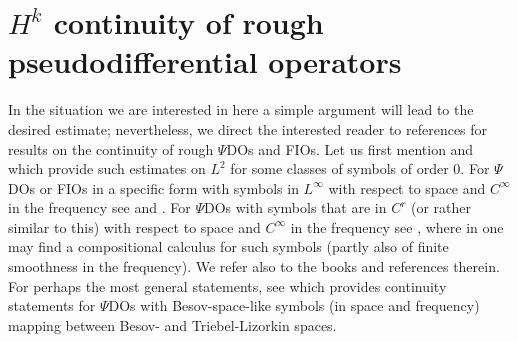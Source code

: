 \documentclass[11pt]{amsart}
\theoremstyle{definition}
\numberwithin{equation}{section}
\begin{document}
    


    



    























\section{$H^k$ continuity of rough pseudodifferential operators} \label{sec_continuity_psdo}

In the situation we are interested in here a simple argument will lead to the desired estimate; nevertheless, we direct the interested reader to references for results on the continuity of rough $\Psi$DOs and FIOs. Let us first mention \cite[Chp.~XI~Thm.~2.2]{zbMATH03709065} and \cite[Thm.~18.1.11']{zbMATH05129478} which provide such estimates on $L^2$ for some classes of symbols of order $0$. For $\Psi$DOs or FIOs in a specific form with symbols in $L^\infty$ with respect to space and $C^\infty$ in the frequency see \cite{zbMATH06357652} and \cite{zbMATH06241375}. For $\Psi$DOs with symbols that are in $C^r$ (or rather similar to this) with respect to space and $C^\infty$ in the frequency see \cite{zbMATH04113185,zbMATH07703335,zbMATH07741454}, where in \cite{zbMATH03895568,zbMATH04113185} one may find a compositional calculus for such symbols (partly also of finite smoothness in the frequency). We refer also to the books \cite{MR1766415,MR1121019} and references therein. For perhaps the most general statements, see \cite{zbMATH00856809} which provides continuity statements for $\Psi$DOs with Besov-space-like symbols (in space and frequency) mapping between Besov- and Triebel-Lizorkin spaces.
\end{document}
